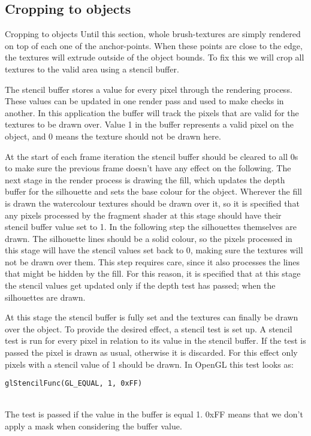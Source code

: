 \documentclass[a4paper, 12pt]{article}
\begin{document}
\subsection{Cropping to objects}
Cropping to objects
Until this section, whole brush-textures are simply rendered on top of each one of the anchor-points. When these points are close to the edge, the textures will extrude outside of the object bounds. To fix this we will crop all textures to the valid area using a stencil buffer.

The stencil buffer stores a value for every pixel through the rendering process. These values can be updated in one render pass and used to make checks in another. In this application the buffer will track the pixels that are valid for the textures to be drawn over. Value 1 in the buffer represents a valid pixel on the object, and 0 means the texture should not be drawn here.

At the start of each frame iteration the stencil buffer should be cleared to all 0s to make sure the previous frame doesn't have any effect on the following. The next stage in the render process is drawing the fill, which updates the depth buffer for the silhouette and sets the base colour for the object. Wherever the fill is drawn the watercolour textures should be drawn over it, so it is specified that any pixels processed by the fragment shader at this stage should have their stencil buffer value set to 1. In the following step the silhouettes themselves are drawn. The silhouette lines should be a solid colour, so the pixels processed in this stage will have the stencil values set back to 0, making sure the textures will not be drawn over them. This step requires care, since it also processes the lines that might be hidden by the fill. For this reason, it is specified that at this stage the stencil values get updated only if the depth test has passed; when the silhouettes are drawn.

At this stage the stencil buffer is fully set and the textures can finally be drawn over the object. To provide the desired effect, a stencil test is set up. A stencil test is run for every pixel in relation to its value in the stencil buffer. If the test is passed the pixel is drawn as usual, otherwise it is discarded. For this effect only pixels with a stencil value of 1 should be drawn. In OpenGL this test looks as:\\
\centerline{\texttt{glStencilFunc(GL\_EQUAL, 1, 0xFF)\;}}\\
The test is passed if the value in the buffer is equal 1. 0xFF means that we don't apply a mask when considering the buffer value.
\end{document}
